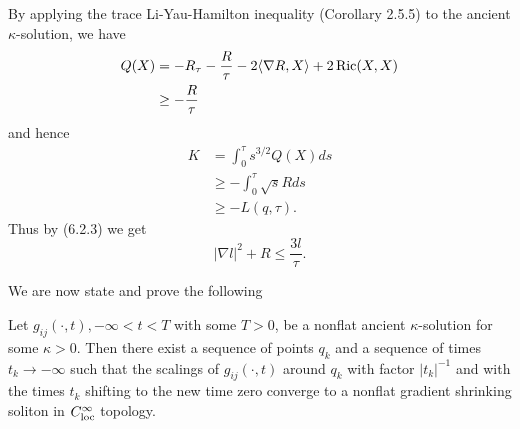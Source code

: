 By applying the trace Li-Yau-Hamilton inequality (Corollary 2.5.5)
to the ancient $\kappa$-solution, we have
\begin{align*}
Q(X)&  = -R_{\tau} -\frac{R}{\tau}-2 \langle\nabla
R,X\rangle+2\operatorname{Ric}(X,X) \\
&  \geq -\frac{R}{\tau}
\end{align*}
and hence
\begin{align*}
K&  = \int_0^{\tau}s^{3/2}Q(X)ds   \\
&  \geq -\int_0^{\tau}\sqrt{s}Rds \\
&  \geq -L(q,\tau).
\end{align*}
Thus by (6.2.3) we get \begin{equation} |\nabla l|^2+R\leq \frac{3l}{\tau}.
\end{equation} %

\medskip
We are now state and prove the following

\begin{theorem}
  \label{thm:cz-ancient-kappa-asymptotic-shrinker}

Let $g_{ij}(\cdot,t), -\infty<t<T$ with some $T>0$, be a nonflat
ancient $\kappa$-solution for some $\kappa >0$. Then there exist a
sequence of points $q_k$ and a sequence of times $t_k \rightarrow
-\infty$ such that the scalings of $g_{ij}(\cdot,t)$ around $q_k$
with factor $|t_k|^{-1}$ and with the times $t_k$ shifting to the
new time zero converge to a nonflat gradient shrinking soliton in
$C_{\rm loc}^\infty$ topology.
\end{theorem}

